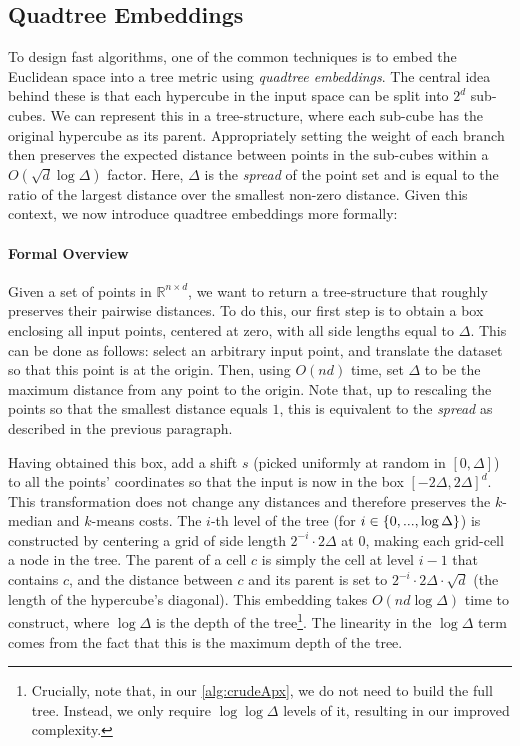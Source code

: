 \subsection{Quadtree Embeddings}

To design fast algorithms, one of the common techniques is to embed the Euclidean space into a tree metric using \emph{quadtree embeddings}.  The central idea
behind these is that each hypercube in the input space can be split into $2^d$ sub-cubes. We can represent this in a tree-structure, where each sub-cube has the
original hypercube as its parent. Appropriately setting the weight of each branch then preserves the expected distance between points in the sub-cubes within
a $O(\sqrt{d} \log \Delta)$ factor. Here, $\Delta$ is the \emph{spread} of the point set and is equal to the ratio of the largest distance over the smallest
non-zero distance.  Given this context, we now introduce quadtree embeddings more formally:

\paragraph*{Formal Overview}

Given a set of points in $\mathbb{R}^{n \times d}$, we want to return a tree-structure that roughly preserves their pairwise distances.  To do this, our first
step is to obtain a box enclosing all input points, centered at zero, with all side lengths equal to $\Delta$. This can be done as follows: select an arbitrary
input point, and translate the dataset so that this point is at the origin. Then, using $O(nd)$ time, set $\Delta$ to be the maximum distance from any point to
the origin. Note that, up to rescaling the points so that the smallest distance equals $1$, this is equivalent to the \emph{spread} as described in the previous
paragraph.

Having obtained this box, add a shift $s$ (picked uniformly at random in $[0, \Delta]$) to all the points' coordinates so that the input is now in the box
$[-2\Delta, 2\Delta]^d$. This transformation does not change any distances and therefore preserves the $k$-median and $k$-means costs.  The $i$-th level of the
tree (for $i \in \left\{ 0, ..., \log \Delta \right\}$) is constructed by centering a grid of side length $2^{-i} \cdot 2\Delta$ at $0$, making each grid-cell a node
in the tree.  The parent of a cell $c$ is simply the cell at level $i-1$ that contains $c$, and the distance between $c$ and its parent is set to $2^{-i} \cdot
2\Delta \cdot \sqrt{d}$ (the length of the hypercube's diagonal). This embedding takes $O(nd \log \Delta)$ time to construct, where $\log \Delta$ is the depth
of the tree\footnote{Crucially, note that, in our \cref{alg:crudeApx}, we do not need to build the full tree.  Instead, we only require $\log \log \Delta$
levels of it, resulting in our improved complexity.}. The linearity in the $\log \Delta$ term comes from the fact that this is the maximum depth of the tree.

